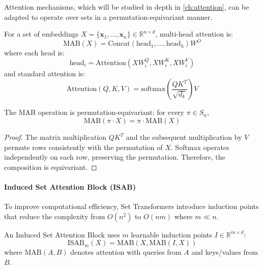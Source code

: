 Attention mechanisms, which will be studied in depth in \autoref{ch:attention}, can be adapted to operate over sets in a permutation-equivariant manner.

\begin{definition}\label{def:set_multihead_attention}
For a set of embeddings $X = \{\mathbf{x}_1, \ldots, \mathbf{x}_n\} \in \mathbb{R}^{n \times d}$, multi-head attention is:
\begin{equation}
\text{MAB}(X) = \text{Concat}(\text{head}_1, \ldots, \text{head}_h)W^O
\end{equation}
where each head is:
\begin{equation}
\text{head}_i = \text{Attention}(XW_i^Q, XW_i^K, XW_i^V)
\end{equation}
and standard attention is:
\begin{equation}
\text{Attention}(Q, K, V) = \text{softmax}\left(\frac{QK^T}{\sqrt{d_k}}\right)V
\end{equation}
\end{definition}

\begin{proposition}
The MAB operation is permutation-equivariant: for every $\pi \in S_n$,
\begin{equation}
\text{MAB}(\pi \cdot X) = \pi \cdot \text{MAB}(X)
\end{equation}
\end{proposition}

\begin{proof}
The matrix multiplication $QK^T$ and the subsequent multiplication by $V$ permute rows consistently with the permutation of $X$. Softmax operates independently on each row, preserving the permutation. Therefore, the composition is equivariant.
\end{proof}

\paragraph{Induced Set Attention Block (ISAB)}

To improve computational efficiency, Set Transformers introduce induction points that reduce the complexity from $O(n^2)$ to $O(nm)$ where $m \ll n$.

\begin{definition}[ISAB]\label{def:isab}
An Induced Set Attention Block uses $m$ learnable induction points $I \in \mathbb{R}^{m \times d}$:
\begin{equation}
\text{ISAB}_m(X) = \text{MAB}(X, \text{MAB}(I, X))
\end{equation}
where $\text{MAB}(A, B)$ denotes attention with queries from $A$ and keys/values from $B$.
\end{definition}

